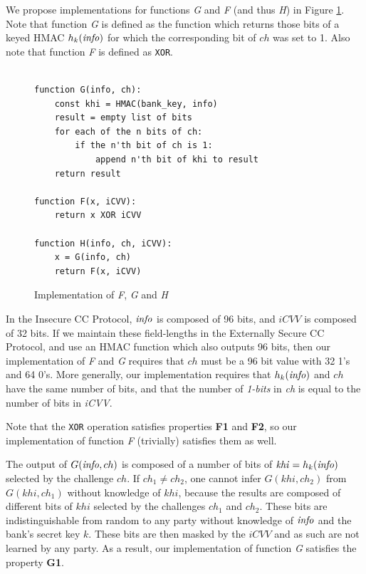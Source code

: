 We propose implementations for functions \emph{G} and \emph{F} (and thus \emph{H}) in Figure \ref{fig:implementation}.
Note that function \emph{G} is defined as the function which returns those bits of a keyed HMAC $h_k(\textrm{\emph{info}})$ for which the corresponding bit of $ch$ was set to 1.
Also note that function \emph{F} is defined as \texttt{XOR}.

\begin{figure}[h!]
  \caption{Implementation of \emph{F}, \emph{G} and \emph{H}}
  \begin{verbatim}

function G(info, ch):
    const khi = HMAC(bank_key, info)
    result = empty list of bits
    for each of the n bits of ch:
        if the n'th bit of ch is 1:
            append n'th bit of khi to result
    return result

function F(x, iCVV):
    return x XOR iCVV

function H(info, ch, iCVV):
    x = G(info, ch)
    return F(x, iCVV)
\end{verbatim}
  \label{fig:implementation}
\end{figure}

In the Insecure CC Protocol, $\textrm{\emph{info}}$ is composed of 96 bits, and $iCVV$ is composed of 32 bits.
If we maintain these field-lengths in the Externally Secure CC Protocol, and use an HMAC function which also outputs 96 bits, then our implementation of \emph{F} and \emph{G} requires that $ch$ must be a 96 bit value with 32 1's and 64 0's.
More generally, our implementation requires that $h_k(\textrm{\emph{info}})$ and $ch$ have the same number of bits,
	and that the number of \emph{1-bits} in \emph{ch} is equal to the number of bits in \emph{iCVV}.

Note that the \texttt{XOR} operation satisfies properties \textbf{F1} and \textbf{F2}, so our implementation of function \emph{F} (trivially) satisfies them as well.

The output of $G(\textrm{\emph{info}}, ch)$ is composed of a number of bits of \linebreak $\textrm{\emph{khi}} = h_k(\textrm{\emph{info}})$ selected by the challenge $ch$.
If $ch_1 \neq ch_2$, one cannot infer $G(khi, ch_2)$ from $G(khi, ch_1)$ without knowledge of $khi$,
because the results are composed of different bits of $khi$ selected by the challenges $ch_1$ and $ch_2$.
These bits are indistinguishable from random to any party without knowledge of $\textrm{\emph{info}}$ and the bank's secret key $k$.
These bits are then masked by the $iCVV$ and as such are not learned by any party.
As a result, our implementation of function \emph{G} satisfies the property \textbf{G1}.
